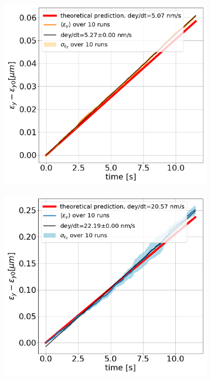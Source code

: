 \begin{figure}[htp]
    \centering
    \begin{subfigure}{.45\textwidth}
        \centering
        \includegraphics[width=.95\linewidth]{images/Ch6/study_4_AN_measured_spectra_sixtracklib.png}  
    \end{subfigure}
    \begin{subfigure}{.45\textwidth}
        \centering
        \includegraphics[width=.95\linewidth]{images/Ch6/study_4_PN_measured_spectra_sixtracklib.png}

\end{subfigure}
\end{figure}
